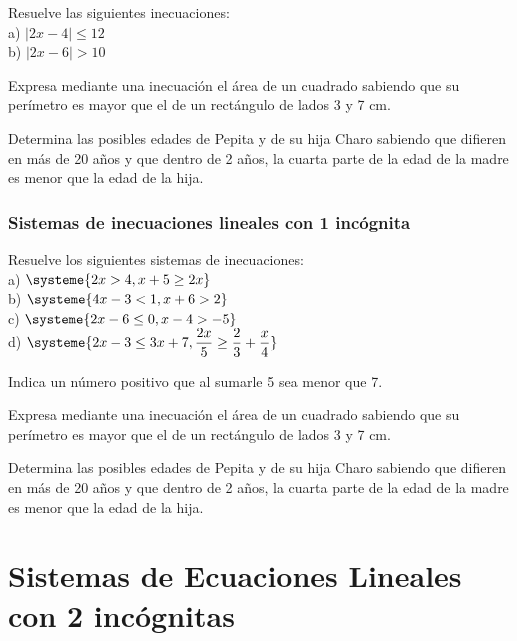 \begin{ejer}
Resuelve las siguientes inecuaciones: \\
a) $|2x-4|\leq 12$ \\
b) $|2x-6|>10$
\end{ejer}

\begin{ejer}
Expresa mediante una inecuación el área de un cuadrado sabiendo que su perímetro es mayor que el de un rectángulo de lados 3 y 7 cm.
\end{ejer}

\begin{ejer}
Determina las posibles edades de Pepita y de su hija Charo sabiendo que difieren en más de 20 años y que dentro de 2 años, la cuarta parte de la edad de la madre es menor que la edad de la hija.
\end{ejer}

\subsubsection{Sistemas de inecuaciones lineales con 1 incógnita}

\begin{ejer}
Resuelve los siguientes sistemas de inecuaciones: \\
a) $\systeme{2x>4, x+5\geq 2x}$ \\
b) $\systeme{4x-3<1, x+6>2}$ \\
c) $\systeme{2x-6 \leq 0, x-4 > -5}$ \\
d) $\systeme{2x-3 \leq 3x+7, \dfrac{2x}{5} \geq \dfrac{2}{3}+\dfrac{x}{4}}$
\end{ejer}

\begin{ejer}
Indica un número positivo que al sumarle 5 sea menor que 7.
\end{ejer}

\begin{ejer}
Expresa mediante una inecuación el área de un cuadrado sabiendo que su perímetro es mayor que el de un rectángulo de lados 3 y 7 cm.
\end{ejer}

\begin{ejer}
Determina las posibles edades de Pepita y de su hija Charo sabiendo que difieren en más de 20 años y que dentro de 2 años, la cuarta parte de la edad de la madre es menor que la edad de la hija.
\end{ejer}

\section{Sistemas de Ecuaciones Lineales con 2 incógnitas}

